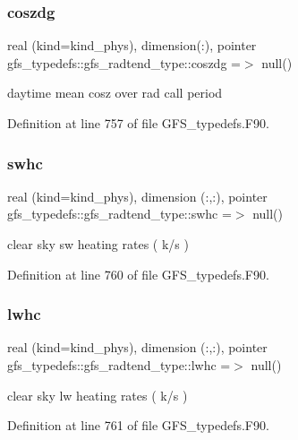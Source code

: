 \subsubsection{coszdg}
{\footnotesize\ttfamily real (kind=kind\+\_\+phys), dimension(\+:), pointer gfs\+\_\+typedefs\+::gfs\+\_\+radtend\+\_\+type\+::coszdg =$>$ null()}



daytime mean cosz over rad call period 



Definition at line 757 of file G\+F\+S\+\_\+typedefs.\+F90.

\mbox{\label{structgfs__typedefs_1_1gfs__radtend__type_a8193583e5c812ff25b0cdca012b22a9f}} 
\subsubsection{swhc}
{\footnotesize\ttfamily real (kind=kind\+\_\+phys), dimension (\+:,\+:), pointer gfs\+\_\+typedefs\+::gfs\+\_\+radtend\+\_\+type\+::swhc =$>$ null()}



clear sky sw heating rates ( k/s ) 



Definition at line 760 of file G\+F\+S\+\_\+typedefs.\+F90.

\mbox{\label{structgfs__typedefs_1_1gfs__radtend__type_a29af2d7069879c9e982fba9a11e9b4d4}} 
\subsubsection{lwhc}
{\footnotesize\ttfamily real (kind=kind\+\_\+phys), dimension (\+:,\+:), pointer gfs\+\_\+typedefs\+::gfs\+\_\+radtend\+\_\+type\+::lwhc =$>$ null()}



clear sky lw heating rates ( k/s ) 



Definition at line 761 of file G\+F\+S\+\_\+typedefs.\+F90.

\mbox{\label{structgfs__typedefs_1_1gfs__radtend__type_a3572137b3a52cecd2d3abedd37afcbf8}} 
